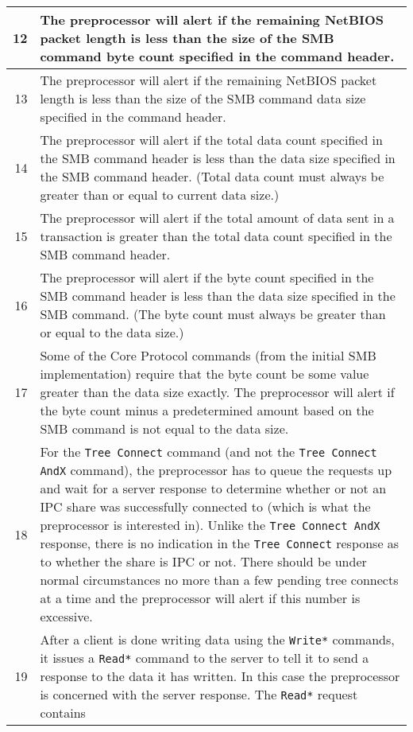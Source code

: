 \documentclass[english]{report}
\begin{document}
\begin{itemize}
\begin{longtable}{|r|p{13.5cm}|}
\hline
 12 & The preprocessor will alert if the remaining NetBIOS packet length is
      less than the size of the SMB command byte count specified in the
      command header.\\
\hline
 13 & The preprocessor will alert if the remaining NetBIOS packet length is
      less than the size of the SMB command data size specified in the command
      header.\\
\hline
 14 & The preprocessor will alert if the total data count specified in the
      SMB command header is less than the data size specified in the SMB
      command header. (Total data count must always be greater than or equal
      to current data size.)\\
\hline
 15 & The preprocessor will alert if the total amount of data sent in a
      transaction is greater than the total data count specified in the SMB
      command header.\\
\hline
 16 & The preprocessor will alert if the byte count specified in the SMB
      command header is less than the data size specified in the SMB command.
      (The byte count must always be greater than or equal to the data size.)\\
\hline
 17 & Some of the Core Protocol commands (from the initial SMB implementation)
      require that the byte count be some value greater than the data size
      exactly. The preprocessor will alert if the byte count minus a
      predetermined amount based on the SMB command is not equal to the data
      size.\\
\hline
 18 & For the \texttt{Tree Connect} command (and not the
      \texttt{Tree Connect AndX} command), the preprocessor has to queue
      the requests up and wait for a server response to determine whether or
      not an IPC share was successfully connected to (which is what the
      preprocessor is interested in). Unlike the \texttt{Tree Connect AndX}
      response, there is no indication in the \texttt{Tree Connect} response
      as to whether the share is IPC or not. There should be under normal
      circumstances no more than a few pending tree connects at a time and
      the preprocessor will alert if this number is excessive.\\
\hline
 19 & After a client is done writing data using the \texttt{Write*} commands,
      it issues a \texttt{Read*} command to the server to tell it to send a
      response to the data it has written. In this case the preprocessor is
      concerned with the server response. The \texttt{Read*} request contains

\end{longtable}
\end{itemize}
\end{document}
